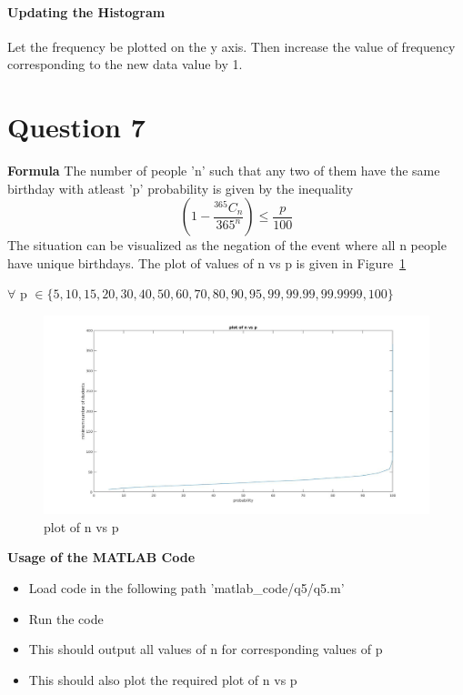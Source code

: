 \documentclass[12pt]{article}
\begin{document}
\paragraph{Updating the Histogram\newline}
Let the frequency be plotted on the y axis.\newline
Then increase the value of frequency corresponding to the new data value by 1.\newline


\newpage
\section{Question 7}
\textbf{Formula}
\newline
The number of people 'n' such that any two of them have the same birthday with atleast 'p' probability is given by the inequality
$$\left(1-\frac{^{365}C_n}{365^n}\right) \leq \frac{p}{100}$$
The situation can be visualized as the negation of the event where all n people have unique birthdays.
\newline
The plot of values of n vs p is given in Figure~\ref{fig:7.1}
\begin{flushright}
$\forall$ p $\in \{5, 10, 15, 20, 30, 40, 50, 60, 70, 80, 90, 95, 99, 99.99, 99.9999, 100\}$
\end{flushright}
\begin{figure} [h!]
\includegraphics[width=\linewidth]{plot.jpg}
\caption{plot of n vs p}
\label{fig:7.1}
\end{figure}
\textbf{Usage of the MATLAB Code}
\begin{itemize}
\item Load code in the following path 'matlab\_code/q5/q5.m'
\item Run the code
\item This should output all values of n for corresponding values of p
\item This should also plot the required plot of n vs p
\end{itemize}
\end{document}
